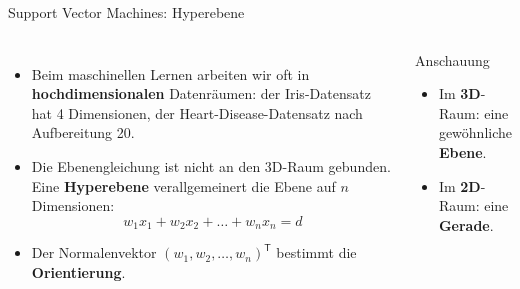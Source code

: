 \begin{frame}{Support Vector Machines: Hyperebene}
\begin{columns}
\begin{itemize}
  \item Beim maschinellen Lernen arbeiten wir oft in \textbf{hochdimensionalen}
        Datenräumen: der Iris-Datensatz hat 4 Dimensionen, der
        Heart-Disease-Datensatz nach Aufbereitung 20.
  \item Die Ebenengleichung ist nicht an den 3D-Raum gebunden. Eine
        \textbf{Hyperebene} verallgemeinert die Ebene auf $n$ Dimensionen:
        \[
          w_1 x_1 + w_2 x_2 + \dots + w_n x_n = d
        \]
  \item Der Normalenvektor $(w_1, w_2, \dots, w_n)^{\mathsf{T}}$ bestimmt die
        \textbf{Orientierung}.
\end{itemize}

\begin{blockC1}{Anschauung}
\begin{itemize}
  \item Im \textbf{3D}-Raum: eine gewöhnliche \textbf{Ebene}.
  \item Im \textbf{2D}-Raum: eine \textbf{Gerade}.
\end{itemize}
\end{blockC1}
\end{columns}
\end{frame}


